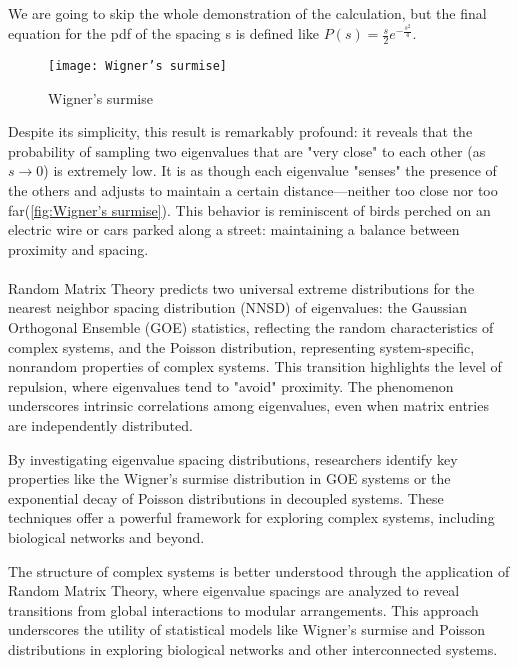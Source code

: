 \noindent We are going to skip the whole demonstration of the calculation, but the final equation for the pdf of the spacing s is defined like $P(s)=\frac{s}{2}e^{-\frac{s^2}{4}}$.

\begin{figure}[H]
    \captionsetup{aboveskip=5pt, belowskip=5pt} %
    \centering
    \texttt{[image: Wigner’s surmise]} %
    \caption{Wigner’s surmise}
    \label{fig:Wigner’s surmise}
\end{figure}
Despite its simplicity, this result is remarkably profound: it reveals that the probability of sampling two eigenvalues that are "very close" to each other (as $s \to 0$) is extremely low.
It is as though each eigenvalue "senses" the presence of the others and adjusts to maintain a certain distance—neither too close nor too far(\autoref{fig:Wigner’s surmise}).
This behavior is reminiscent of birds perched on an electric wire or cars parked along a street: maintaining a balance between proximity and spacing. \cite{livan_introduction_2017}
\\\\
Random Matrix Theory predicts two universal extreme distributions for the nearest neighbor spacing distribution (NNSD) of eigenvalues: the Gaussian Orthogonal Ensemble (GOE) statistics, reflecting the random characteristics of complex systems, and the Poisson distribution, representing system-specific, nonrandom properties of complex systems.
This transition highlights the level of repulsion, where eigenvalues tend to "avoid" proximity.
The phenomenon underscores intrinsic correlations among eigenvalues, even when matrix entries are independently distributed.

\noindent By investigating eigenvalue spacing distributions, researchers identify key properties like the Wigner's surmise distribution in GOE systems or the exponential decay of Poisson distributions in decoupled systems.
These techniques offer a powerful framework for exploring complex systems, including biological networks and beyond.\cite{luo_application_2006}

The structure of complex systems is better understood through the application of Random Matrix Theory, where eigenvalue spacings are analyzed to reveal transitions from global interactions to modular arrangements.
This approach underscores the utility of statistical models like Wigner’s surmise and Poisson distributions in exploring biological networks and other interconnected systems.

